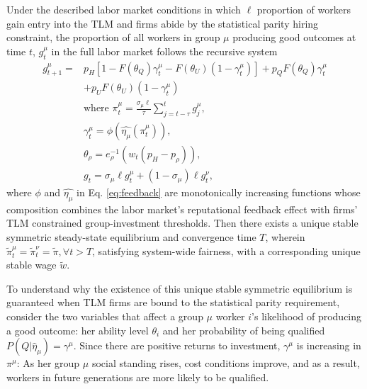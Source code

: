 \documentclass[sigconf]{acmart}
\theoremstyle{definition}
\begin{document}
\begin{theorem} 
Under the described labor market conditions in which $\ell$ proportion of workers gain entry into the TLM and firms abide by the statistical parity hiring constraint, the proportion of all workers in group $\mu$ producing good outcomes at time $t$, $g^\mu_t$ in the full labor market follows the recursive system
\begin{align}%
g^\mu_{t+1} =& p_H[1-F({\theta_Q})\gamma^\mu_t-F({\theta_U})(1-\gamma^\mu_t)]+ p_{Q}F({\theta_Q})\gamma^\mu_t
\\
&+p_{U}F(\theta_U)(1-\gamma^\mu_t) \nonumber
\\
&\text{where } \pi^\mu_t = \frac{\sigma_\mu \ell}{\tau} \sum^{t}_{j=t-\tau} g^\mu_j,
\label{eq:social}
\\
&\gamma^\mu_t = \phi(\widehat{\eta_\mu}(\pi^\mu_t)),
\label{eq:feedback}
\\
&{\theta_\rho} = e_\rho^{-1}(w_t(p_H - p_{\rho})),
\\
&g_{t} = \sigma_\mu \ell g^\mu_{t} + (1-\sigma_\mu)\ell g^\nu_{t},
\end{align}
where $\phi$ and $\widehat{\eta_\mu}$ in Eq. \ref{eq:feedback} are monotonically increasing functions whose composition combines the labor market's reputational feedback effect with firms' TLM constrained group-investment thresholds. Then there exists a unique stable symmetric steady-state equilibrium and convergence time $T$, wherein $\tilde{\pi}^\mu_{t} = \tilde{\pi}^\nu_{t} = \tilde{\pi}, \forall t > T$, satisfying system-wide fairness, with a corresponding unique stable wage $\tilde{w}$.
\label{theorem1}
\end{theorem}
To understand why the existence of this unique stable symmetric equilibrium is guaranteed when TLM firms are bound to the statistical parity requirement, consider the two variables that affect a group $\mu$ worker $i$'s likelihood of producing a good outcome: her ability level $\theta_i$ and her probability of being qualified $P(Q|\hat{\eta}_\mu) = \gamma^\mu$. Since there are positive returns to investment, $\gamma^\mu$ is increasing in $\pi^\mu$: As her group $\mu$ social standing rises, cost conditions improve, and as a result, workers in future generations are more likely to be qualified. 
\end{document}
